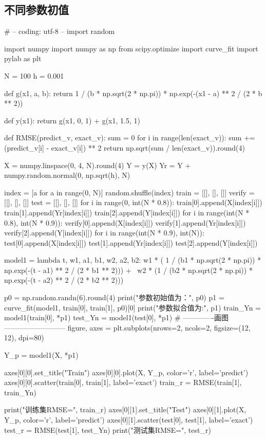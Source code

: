 \subsection{不同参数初值}
\begin{python}
    # -- coding: utf-8 --
import random

import numpy
import numpy as np
from scipy.optimize import curve_fit
import pylab as plt

N = 100
h = 0.001


def g(x1, a, b):
    return 1 / (b * np.sqrt(2 * np.pi)) * np.exp(-(x1 - a) ** 2 / (2 * b ** 2))


def y(x1):
    return g(x1, 0, 1) + g(x1, 1.5, 1)


def RMSE(predict_v, exact_v):
    sum = 0
    for i in range(len(exact_v)):
        sum += (predict_v[i] - exact_v[i]) ** 2
    return np.sqrt(sum / len(exact_v)).round(4)


X = numpy.linspace(0, 4, N).round(4)
Y = y(X)
Yr = Y + numpy.random.normal(0, np.sqrt(h), N)

index = [a for a in range(0, N)]
random.shuffle(index)
train = [[], [], []]
verify = [[], [], []]
test = [[], [], []]
for i in range(0, int(N * 0.8)):
    train[0].append(X[index[i]])
    train[1].append(Yr[index[i]])
    train[2].append(Y[index[i]])
for i in range(int(N * 0.8), int(N * 0.9)):
    verify[0].append(X[index[i]])
    verify[1].append(Yr[index[i]])
    verify[2].append(Y[index[i]])
for i in range(int(N * 0.9), int(N)):
    test[0].append(X[index[i]])
    test[1].append(Yr[index[i]])
    test[2].append(Y[index[i]])

model1 = lambda t, w1, a1, b1, w2, a2, b2: w1 * (
        1 / (b1 * np.sqrt(2 * np.pi)) * np.exp(-(t - a1) ** 2 / (2 * b1 ** 2))) + \
                                           w2 * (1 / (b2 * np.sqrt(2 * np.pi)) * np.exp(-(t - a2) ** 2 / (2 * b2 ** 2)))

p0 = np.random.randn(6).round(4)
print("参数初始值为：", p0)
p1 = curve_fit(model1, train[0], train[1], p0)[0]
print("参数拟合值为:", p1)
train_Yn = model1(train[0], *p1)
test_Yn = model1(test[0], *p1)
# -------------画图--------------------------
figure, axes = plt.subplots(nrows=2, ncols=2, figsize=(12, 12), dpi=80)

Y_p = model1(X, *p1)

axes[0][0].set_title("Train")
axes[0][0].plot(X, Y_p, color='r', label='predict')
axes[0][0].scatter(train[0], train[1], label='exact')
train_r = RMSE(train[1], train_Yn)

print("训练集RMSE=", train_r)
axes[0][1].set_title("Test")
axes[0][1].plot(X, Y_p, color='r', label='predict')
axes[0][1].scatter(test[0], test[1], label='exact')
test_r = RMSE(test[1], test_Yn)
print("测试集RMSE=", test_r)


\end{python}
